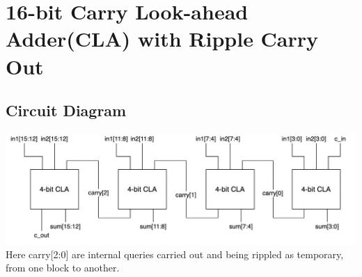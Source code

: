 \section{16-bit Carry Look-ahead Adder(CLA) with Ripple Carry Out}
\subsection{Circuit Diagram}
\includegraphics[width=18cm]{images/cla_ripple.png}
Here carry[2:0] are internal queries carried out and being rippled as temporary, from one block to another.



